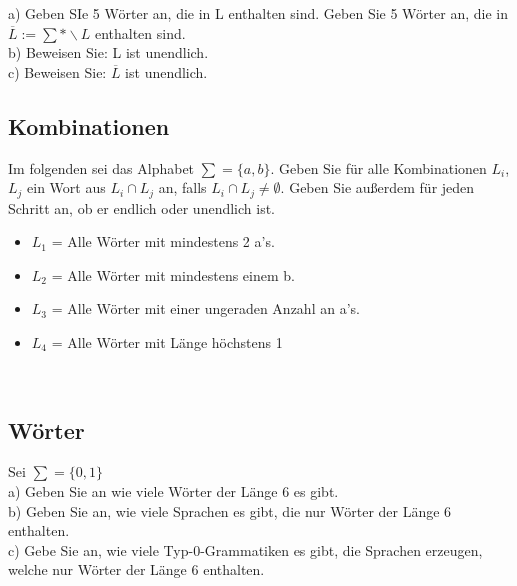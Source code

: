\documentclass[paper=a4, fontsize=11pt]{scrartcl}
\numberwithin{equation}{section}
\numberwithin{figure}{section}
\numberwithin{table}{section}
\begin{document}
a) Geben SIe 5 Wörter an, die in L enthalten sind. Geben Sie 5 Wörter an, die in $\overline{L} := \sum * \backslash L$ enthalten sind. \\

b) Beweisen Sie: L ist unendlich. \\

c) Beweisen Sie: $\overline{L}$ ist unendlich. \\


\subsection{Kombinationen}

Im folgenden sei das Alphabet $\sum = \{ a,b \}$. Geben Sie für alle Kombinationen $L_{i}$, $L_{j}$ ein Wort aus $L_{i} \cap L_{j}$ an, falls $L_{i} \cap L_{j} \neq \emptyset$. Geben Sie außerdem für jeden Schritt an, ob er endlich oder unendlich ist. \\

\begin{itemize}
\item $L_{1}$ = { Alle Wörter mit mindestens 2 a's. } 
\item $L_{2}$ = { Alle Wörter mit mindestens einem b.}
\item $L_{3}$ = { Alle Wörter mit einer ungeraden Anzahl an a's.}
\item $L_{4}$ = { Alle Wörter mit Länge höchstens 1}
\end{itemize} 
\\


\subsection{Wörter}

Sei $\sum = \{ 0,1 \}$ \\

a) Geben Sie an wie viele Wörter der Länge 6 es gibt. \\

b) Geben Sie an, wie viele Sprachen es gibt, die nur Wörter der Länge 6 enthalten. \\

c) Gebe Sie an, wie viele Typ-0-Grammatiken es gibt, die Sprachen erzeugen, welche nur Wörter der Länge 6 enthalten. \\
\end{document}
